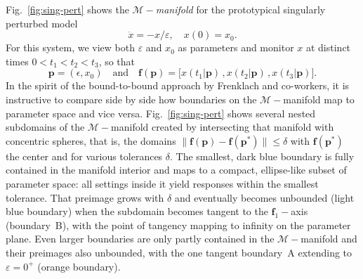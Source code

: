Fig.~\ref{fig:sing-pert} shows the $\mathcal{M}-$\emph{manifold} for
the prototypical singularly perturbed model
% 
\begin{equation}
  \dot{x} = -x/\varepsilon, \quad
  x(0) = x_0 .
  \label{1D-model-singpert}
\end{equation}
For this system, we view both $\varepsilon$ and $x_0$ as parameters
and monitor $x$ at distinct times $0 < t_1 < t_2 < t_3$, so that
% 
\begin{equation}
  \mathbf{p} = (\epsilon , x_0)
  \quad\mbox{and}\quad
  \mathbf{f}(\mathbf{p})
  =
  \big[
  x(t_1 \vert \mathbf{p}) \, ,
  x(t_2 \vert \mathbf{p}) \, ,
  x(t_3 \vert \mathbf{p})
  \big] . 
  \label{1D-pf}
\end{equation}
% 
In the spirit of the bound-to-bound approach by Frenklach and
co-workers, it is instructive to compare side by side how boundaries
on the $\mathcal{M}-$manifold map to parameter space and vice versa.
Fig.~\ref{fig:sing-pert} shows several nested subdomains of the
$\mathcal{M}-$manifold created by intersecting that manifold with
concentric spheres, that is, the domains
$\|\mathbf{f}(\mathbf{p}) - \mathbf{f}(\mathbf{p}^*)\| \le \delta$
with $\mathbf{f}(\mathbf{p}^*)$ the center and for various tolerances
$\delta$.  The smallest, dark blue boundary is fully contained in the
manifold interior and maps to a compact, ellipse-like subset of
parameter space: all settings inside it yield responses within the
smallest tolerance.  That preimage grows with $\delta$ and eventually
becomes unbounded (light blue boundary) when the subdomain becomes
tangent to the $\mathbf{f}_1-$axis (boundary~B), with the point of
tangency mapping to infinity on the parameter plane.  Even larger
boundaries are only partly contained in the $\mathcal{M}-$manifold and
their preimages also unbounded, with the one tangent boundary~A
extending to $\varepsilon=0^+$ (orange boundary).

